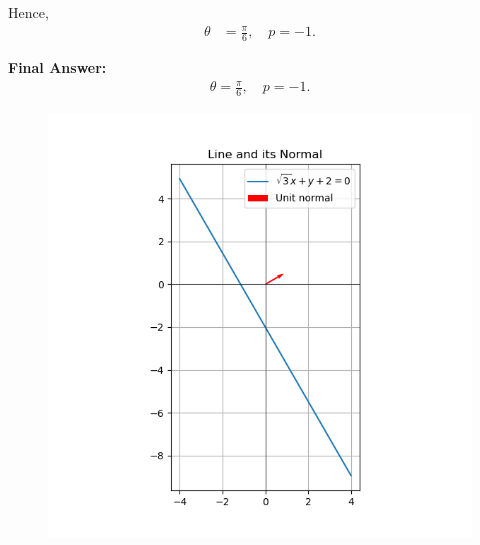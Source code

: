 \documentclass[12pt]{article}
\begin{document}
Hence,
\begin{align}
\theta &= \tfrac{\pi}{6}, \quad p = -1. \label{eq6}
\end{align}

\noindent \textbf{Final Answer: } 
\begin{align}
\boxed{
\theta = \tfrac{\pi}{6}, \quad p = -1.
}
\end{align}

\begin{figure}[H]
    \centering
    \includegraphics[width=0.9\columnwidth]{figs/normalform.png}
    \caption{}
    \label{fig:placeholder}
\end{figure}
\end{document}
